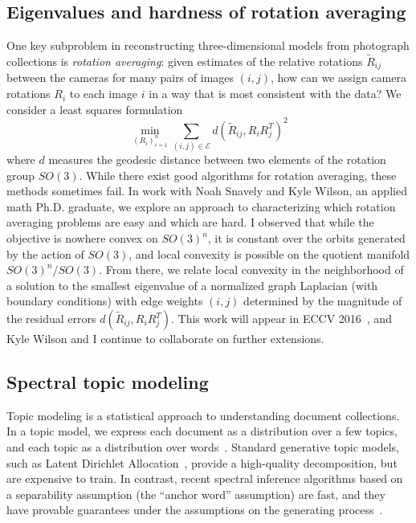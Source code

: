 \documentclass[11pt]{amsart}
\begin{document}
\subsection*{Eigenvalues and hardness of rotation averaging}

One key subproblem in reconstructing three-dimensional models from
photograph collections is {\em rotation averaging}: given estimates of
the relative rotations $\tilde{R}_{ij}$ between the cameras for many
pairs of images $(i,j)$, how can we assign camera rotations $R_i$ to
each image $i$ in a way that is most consistent with the data?  We
consider a least squares formulation
\[
  \min_{(R_i)_{i=1}^n} \sum_{(i,j)
  \in \mathcal{E}} d(\tilde{R}_{ij}, R_i R_j^T)^2
\]
where $d$ measures the geodesic distance between two elements of
the rotation group $SO(3)$.  While there exist good algorithms for
rotation averaging, these methods sometimes fail.  In work with
Noah Snavely and Kyle Wilson, an applied math Ph.D. graduate,
we explore an approach to characterizing which rotation averaging
problems are easy and which are hard.
%
I observed that while the objective is nowhere convex on $SO(3)^n$, it
is constant over the orbits generated by the action of $SO(3)$, and local
convexity is possible on the quotient manifold $SO(3)^n/SO(3)$. From
there, we relate local convexity in the neighborhood of a solution to
the smallest eigenvalue of a normalized graph Laplacian (with boundary
conditions) with edge weights $(i,j)$ determined by the magnitude of the
residual errors $d(\tilde{R}_{ij}, R_i R_j^T)$.  This work will appear
in ECCV 2016~\cite{2016-rotations}, and Kyle Wilson and I continue to
collaborate on further extensions.


\subsection*{Spectral topic modeling}

Topic modeling is a statistical approach to understanding
document collections.  In a topic model,
we express each document as a distribution
over a few topics, and each topic as a distribution over
words~\cite{Blei:2012:Survey}. Standard
generative topic models, such as
Latent Dirichlet Allocation~\cite{Blei:2003:LDA}, provide a
high-quality decomposition, but are expensive to train. In contrast,
recent spectral inference algorithms based on a separability assumption
(the ``anchor word'' assumption) are fast, and they have provable guarantees
under the assumptions on the
generating process~\cite{Arora:2012:AGM,Arora:2013:Practical}.
\end{document}
